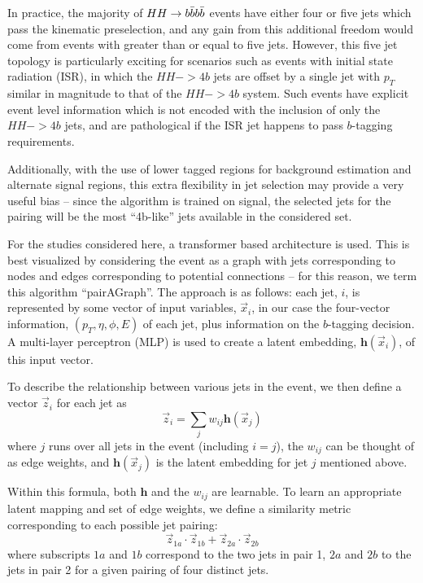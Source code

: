 In practice, the majority of $HH\rightarrow b\bar{b}b\bar{b}$ events have either four or five jets which pass 
the kinematic preselection, and any gain from this additional freedom would come from events with 
greater than or equal to five jets. However, this five jet topology is particularly exciting 
for scenarios such as events with initial state radiation (ISR), in which the $HH->4b$ jets are offset by 
a single jet with $p_{T}$ similar in magnitude to that of the $HH->4b$ system. Such events have explicit 
event level information which is not encoded with the inclusion of only the $HH->4b$ jets, and are 
pathological if the ISR jet happens to pass $b$-tagging requirements.

Additionally, with the use of lower tagged regions for background estimation and alternate 
signal regions, this extra flexibility in jet selection may provide a very useful bias -- 
since the algorithm is trained on signal, the selected jets for the pairing will be the 
most ``4b-like'' jets available in the considered set.

For the studies considered here, a transformer  based architecture is used. This is 
best visualized by considering the event as a graph with jets corresponding to nodes and 
edges corresponding to potential connections -- for this reason, we term this algorithm ``pairAGraph''.
The approach is as follows: each jet, $i$, is represented by some vector of input variables, 
$\vec{x}_i$, in our case the four-vector information, $(p_{T}, \eta, \phi, E)$ of each jet, plus 
information on the $b$-tagging decision. A multi-layer perceptron (MLP) is used to create a latent 
embedding, $\mathbf{h}(\vec{x}_i)$, of this input vector.

To describe the relationship between various jets in the event, we then define a vector $\vec{z}_{i}$ 
for each jet as 
\begin{equation}
\vec{z}_i = \sum\limits_j w_{ij}\mathbf{h}(\vec{x}_j)
\end{equation}
where $j$ runs over all jets in the event (including $i=j$), the $w_{ij}$ can be thought of as 
edge weights, and $\mathbf{h}(\vec{x}_j)$ is the latent embedding for jet $j$ mentioned above.

Within this formula, both $\mathbf{h}$ and the $w_{ij}$ are learnable. To learn an appropriate 
latent mapping and set of edge weights, we define a similarity metric corresponding to each 
possible jet pairing:
\begin{equation}
\vec{z}_{1a}\cdot \vec{z}_{1b} + \vec{z}_{2a}\cdot \vec{z}_{2b}
\end{equation}
where subscripts $1a$ and $1b$ correspond to the two jets in pair 1, $2a$ and $2b$ to 
the jets in pair 2 for a given pairing of four distinct jets.

